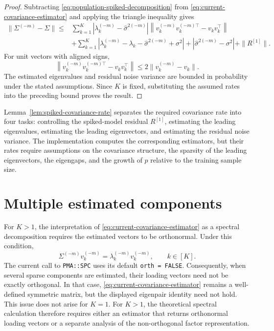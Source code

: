 \documentclass[11pt]{article}
\begin{document}
\begin{proof}
Subtracting \eqref{eq:population-spiked-decomposition} from
\eqref{eq:current-covariance-estimator} and applying the triangle inequality
gives
\begin{align*}
\|\Sigma^{(-m)}-\Sigma\|
\leq{}&
\sum_{k=1}^K
\left|\lambda_k^{(-m)}-\widehat\sigma^{2(-m)}\right|
\left\|v_k^{(-m)}v_k^{(-m)\top}-v_kv_k^\top\right\|\\
&+
\sum_{k=1}^K
\left|
\lambda_k^{(-m)}-\lambda_k
-\widehat\sigma^{2(-m)}+\sigma^2
\right|
+|\widehat\sigma^{2(-m)}-\sigma^2|
+\|R^{[1]}\|.
\end{align*}
For unit vectors with aligned signs,
\begin{equation*}
\left\|v_k^{(-m)}v_k^{(-m)\top}-v_kv_k^\top\right\|
\leq 2\|v_k^{(-m)}-v_k\|.
\end{equation*}
The estimated eigenvalues and residual noise variance are bounded in
probability under the stated assumptions. Since $K$ is fixed, substituting
the assumed rates into the preceding bound proves the result.
\end{proof}

Lemma~\ref{lem:spiked-covariance-rate} separates the required covariance rate
into four tasks: controlling the spiked-model residual $R^{[1]}$, estimating
the leading eigenvalues, estimating the leading eigenvectors, and estimating
the residual noise variance. The implementation computes the corresponding
estimators, but their rates require assumptions on the covariance structure,
the sparsity of the leading eigenvectors, the eigengaps, and the growth of
$p$ relative to the training sample size.

\section{Multiple estimated components}

For $K>1$, the interpretation of
\eqref{eq:current-covariance-estimator} as a spectral decomposition requires
the estimated vectors to be orthonormal. Under this condition,
\begin{equation*}
\Sigma^{(-m)}v_k^{(-m)}
=\lambda_k^{(-m)}v_k^{(-m)},
\qquad k\in[K].
\end{equation*}
The current call to \texttt{PMA::SPC} uses its default
\texttt{orth = FALSE}. Consequently, when several sparse components are
estimated, their loading vectors need not be exactly orthogonal. In that
case, \eqref{eq:current-covariance-estimator} remains a well-defined symmetric
matrix, but the displayed eigenpair identity need not hold. This issue does
not arise for $K=1$. For $K>1$, the theoretical spectral calculation therefore
requires either an estimator that returns orthonormal loading vectors or a
separate analysis of the non-orthogonal factor representation.
\end{document}
